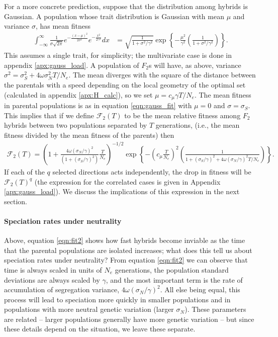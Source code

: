 \documentclass{article}
\newcommand{\plr}[1]{\todo[color=blue!25]{#1}}
\newcommand{\plr}[1]{{\color{blue}\it #1}}
\newcommand{\1}{\mathbbm{1}}
\newcommand{\fit}{\mathcal{F}}
\begin{document}
For a more concrete prediction, suppose that the distribution among hybrids is Gaussian.
A population whose trait distribution is Gaussian with mean $\mu$ and variance $\sigma$,
has mean fitness 
\begin{align} \label{eqn:gauss_fit}
\int_{-\infty}^\infty \frac{1}{\sigma\sqrt{2\pi}} e^{-\frac{(x-\mu)^2}{2\sigma^2}} e^{-\frac{x^2}{2\gamma^2}} dx
&=
\sqrt{\frac{1}{1 + \sigma^2/\gamma^2}} \exp\left\{-\frac{\mu^2}{\gamma^2}\left(\frac{1}{1 + \sigma^2/\gamma^2}\right)\right\} .
\end{align}
This assumes a single trait, for simplicity; the multivariate case is done in appendix \ref{apx:gauss_load}.
A population of $F_2$s will have, as above, variance $\sigma^2 = \sigma^2_S + 4 \omega \sigma^2_N T/N_e$.
The mean diverges with the square of the distance between the parentals
with a speed depending on the local geometry of the optimal set
(calculated in appendix \ref{apx:H_calc}), so we set $\mu = c_\mu \gamma T/N_e$.
The mean fitness in parental populations is as in equation \ref{eqn:gauss_fit} with $\mu=0$ and $\sigma = \sigma_S$.
This implies that if we define $\fit_2(T)$ to be the mean relative fitness among $F_2$ hybrids
between two populations separated by $T$ generations, 
(i.e., the mean fitness divided by the mean fitness of the parents)
then
\plr{figure out how dimensions come in here}
\begin{align} \label{eqn:fit2}
\fit_2(T) = 
  \left(1 + \frac{4 \omega (\sigma_N/\gamma)^2}{(1 + (\sigma_S/\gamma)^2)} \frac{T}{N_e} \right)^{-1/2} 
     \exp\left\{-\left(c_\mu \frac{T}{N_e}\right)^2 \left(\frac{1}{1 + (\sigma_S/\gamma)^2 + 4 \omega (\sigma_N/\gamma)^2 T/N_e}\right)\right\} .
\end{align}
If each of the $q$ selected directions acts independently,
the drop in fitness will be $\fit_2(T)^q$
(the expression for the correlated cases is given in Appendix \ref{apx:gauss_load}).
We discuss the implications of this expression in the next section.


\paragraph{Speciation rates under neutrality}
Above, equation \eqref{eqn:fit2} shows how fast hybrids become inviable 
as the time that the parental populations are isolated increases;
what does this tell us about speciation rates under neutrality?
From equation \eqref{eqn:fit2} we can observe that
time is always scaled in units of $N_e$ generations,
the population standard deviations are always scaled by $\gamma$,
and the most important term is the rate of accumulation of segregation variance,
$4 \omega (\sigma_N/\gamma)^2$.
All else being equal, this process will lead to speciation more quickly in smaller populations
and in populations with more neutral genetic variation (larger $\sigma_N$).
These parameters are related -- larger populations generally have more genetic variation --
but since these details depend on the situation, we leave these separate.
\end{document}
